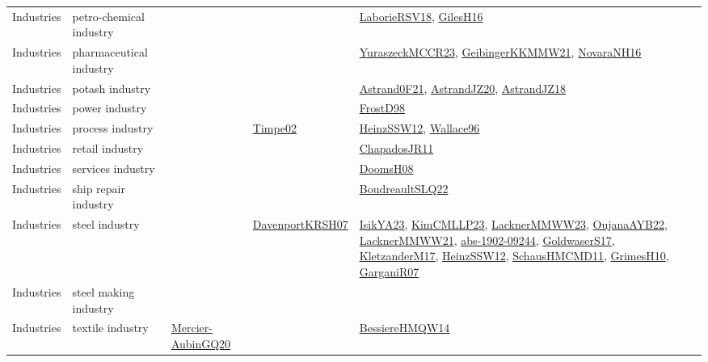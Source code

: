 {\begin{longtable}{lp{3cm}>{\raggedright}p{6cm}>{\raggedright}p{6cm}p{8cm}}
Industries & petro-chemical industry &  &  & \href{articles/LaborieRSV18.pdf}{LaborieRSV18}\cite{LaborieRSV18}, \href{papers/GilesH16.pdf}{GilesH16}\cite{GilesH16}\\
Industries & pharmaceutical industry &  &  & \href{articles/YuraszeckMCCR23.pdf}{YuraszeckMCCR23}\cite{YuraszeckMCCR23}, \href{papers/GeibingerKKMMW21.pdf}{GeibingerKKMMW21}\cite{GeibingerKKMMW21}, \href{articles/NovaraNH16.pdf}{NovaraNH16}\cite{NovaraNH16}\\
Industries & potash industry &  &  & \href{papers/Astrand0F21.pdf}{Astrand0F21}\cite{Astrand0F21}, \href{articles/AstrandJZ20.pdf}{AstrandJZ20}\cite{AstrandJZ20}, \href{papers/AstrandJZ18.pdf}{AstrandJZ18}\cite{AstrandJZ18}\\
Industries & power industry &  &  & \href{papers/FrostD98.pdf}{FrostD98}\cite{FrostD98}\\
Industries & process industry &  & \href{articles/Timpe02.pdf}{Timpe02}\cite{Timpe02} & \href{articles/HeinzSSW12.pdf}{HeinzSSW12}\cite{HeinzSSW12}, \href{articles/Wallace96.pdf}{Wallace96}\cite{Wallace96}\\
Industries & retail industry &  &  & \href{papers/ChapadosJR11.pdf}{ChapadosJR11}\cite{ChapadosJR11}\\
Industries & services industry &  &  & \href{papers/DoomsH08.pdf}{DoomsH08}\cite{DoomsH08}\\
Industries & ship repair industry &  &  & \href{papers/BoudreaultSLQ22.pdf}{BoudreaultSLQ22}\cite{BoudreaultSLQ22}\\
Industries & steel industry &  & \href{papers/DavenportKRSH07.pdf}{DavenportKRSH07}\cite{DavenportKRSH07} & \href{articles/IsikYA23.pdf}{IsikYA23}\cite{IsikYA23}, \href{papers/KimCMLLP23.pdf}{KimCMLLP23}\cite{KimCMLLP23}, \href{articles/LacknerMMWW23.pdf}{LacknerMMWW23}\cite{LacknerMMWW23}, \href{papers/OujanaAYB22.pdf}{OujanaAYB22}\cite{OujanaAYB22}, \href{papers/LacknerMMWW21.pdf}{LacknerMMWW21}\cite{LacknerMMWW21}, \href{articles/abs-1902-09244.pdf}{abs-1902-09244}\cite{abs-1902-09244}, \href{papers/GoldwaserS17.pdf}{GoldwaserS17}\cite{GoldwaserS17}, \href{papers/KletzanderM17.pdf}{KletzanderM17}\cite{KletzanderM17}, \href{articles/HeinzSSW12.pdf}{HeinzSSW12}\cite{HeinzSSW12}, \href{articles/SchausHMCMD11.pdf}{SchausHMCMD11}\cite{SchausHMCMD11}, \href{papers/GrimesH10.pdf}{GrimesH10}\cite{GrimesH10}, \href{papers/GarganiR07.pdf}{GarganiR07}\cite{GarganiR07}\\
Industries & steel making industry &  &  & \\
Industries & textile industry & \href{papers/Mercier-AubinGQ20.pdf}{Mercier-AubinGQ20}\cite{Mercier-AubinGQ20} &  & \href{papers/BessiereHMQW14.pdf}{BessiereHMQW14}\cite{BessiereHMQW14}\\

\end{longtable}}
